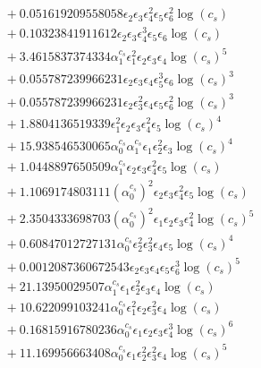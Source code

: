 \documentclass[10pt]{article}
\begin{document}
\begin{align*}
&{}  + 0.051619209558058 \epsilon_{2} \epsilon_{3} \epsilon_{4}^{2} \epsilon_{5} \epsilon_{6}^{2} \log{\left(c_{s} \right)} \\
&{}  + 0.10323841911612 \epsilon_{2} \epsilon_{3} \epsilon_{4}^{3} \epsilon_{5} \epsilon_{6} \log{\left(c_{s} \right)} \\
&{}  + 3.4615837374334 \alpha_{1}^{c_s} \epsilon_{1}^{2} \epsilon_{2} \epsilon_{3} \epsilon_{4} \log{\left(c_{s} \right)}^{5} \\
&{}  + 0.055787239966231 \epsilon_{2} \epsilon_{3} \epsilon_{4} \epsilon_{5}^{3} \epsilon_{6} \log{\left(c_{s} \right)}^{3} \\
&{}  + 0.055787239966231 \epsilon_{2} \epsilon_{3}^{2} \epsilon_{4} \epsilon_{5} \epsilon_{6}^{2} \log{\left(c_{s} \right)}^{3} \\
&{}  + 1.8804136519339 \epsilon_{1}^{2} \epsilon_{2} \epsilon_{3} \epsilon_{4}^{2} \epsilon_{5} \log{\left(c_{s} \right)}^{4} \\
&{}  + 15.938546530065 \alpha_{0}^{c_s} \alpha_{1}^{c_s} \epsilon_{1} \epsilon_{2}^{2} \epsilon_{3} \log{\left(c_{s} \right)}^{4} \\
&{}  + 1.0448897650509 \alpha_{1}^{c_s} \epsilon_{2} \epsilon_{3} \epsilon_{4}^{2} \epsilon_{5} \log{\left(c_{s} \right)} \\
&{}  + 1.1069174803111 \left(\alpha_{0}^{c_s}\right)^{2} \epsilon_{2} \epsilon_{3} \epsilon_{4}^{2} \epsilon_{5} \log{\left(c_{s} \right)} \\
&{}  + 2.3504333698703 \left(\alpha_{0}^{c_s}\right)^{2} \epsilon_{1} \epsilon_{2} \epsilon_{3} \epsilon_{4}^{2} \log{\left(c_{s} \right)}^{5} \\
&{}  + 0.60847012727131 \alpha_{0}^{c_s} \epsilon_{2}^{2} \epsilon_{3}^{2} \epsilon_{4} \epsilon_{5} \log{\left(c_{s} \right)}^{4} \\
&{}  + 0.0012087360672543 \epsilon_{2} \epsilon_{3} \epsilon_{4} \epsilon_{5} \epsilon_{6}^{3} \log{\left(c_{s} \right)}^{5} \\
&{}  + 21.13950029507 \alpha_{1}^{c_s} \epsilon_{1} \epsilon_{2}^{2} \epsilon_{3} \epsilon_{4} \log{\left(c_{s} \right)} \\
&{}  + 10.622099103241 \alpha_{0}^{c_s} \epsilon_{1}^{2} \epsilon_{2} \epsilon_{3}^{2} \epsilon_{4} \log{\left(c_{s} \right)} \\
&{}  + 0.16815916780236 \alpha_{0}^{c_s} \epsilon_{1} \epsilon_{2} \epsilon_{3} \epsilon_{4}^{3} \log{\left(c_{s} \right)}^{6} \\
&{}  + 11.169956663408 \alpha_{0}^{c_s} \epsilon_{1} \epsilon_{2}^{2} \epsilon_{3}^{2} \epsilon_{4} \log{\left(c_{s} \right)}^{5} \\

\end{align*}
\end{document}
